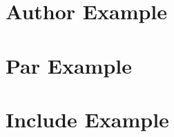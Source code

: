 \documentclass{book}
\newcommand{\+}{\discretionary{\mbox{\scriptsize$\hookleftarrow$}}{}{}}
\begin{document}
\chapter{Author Example}\label{author_example}\hypertarget{author_example}{}
\chapter{Par Example}\label{par_example}\hypertarget{par_example}{}
\chapter{Include Example}\label{include_example}\hypertarget{include_example}{}


\printindex
\end{document}
